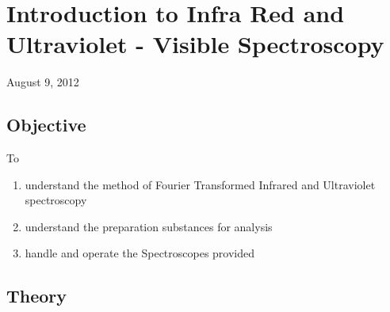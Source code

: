 \chapter{Introduction to Infra Red and Ultraviolet - Visible Spectroscopy \label{chapter1}}
\begin{flushright}
August 9, 2012
\end{flushright}
\section{Objective}
To
\begin{enumerate}
	\item understand the method of Fourier Transformed Infrared and Ultraviolet spectroscopy
	\item understand the preparation substances for analysis
	\item handle and operate the Spectroscopes provided
\end{enumerate}

\section{Theory}
